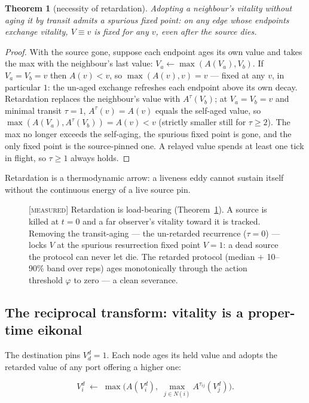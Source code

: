 \documentclass[11pt]{article}
\theoremstyle{plain}
\newtheorem{theorem}{Theorem}[section]
\numberwithin{equation}{section}
\begin{document}
\begin{theorem}[necessity of retardation]\label{thm:retardation}
Adopting a neighbour's vitality without aging it by transit admits a spurious fixed point: on any edge whose endpoints exchange vitality, $V\equiv v$ is fixed for any $v$, even after the source dies.
\end{theorem}
\begin{proof}
With the source gone, suppose each endpoint ages its own value and takes the max with the neighbour's last value: $V_a\leftarrow\max(A(V_a),V_b)$. If $V_a=V_b=v$ then $A(v)<v$, so $\max(A(v),v)=v$ — fixed at any $v$, in particular $1$: the un-aged exchange refreshes each endpoint above its own decay. Retardation replaces the neighbour's value with $A^{\tau}(V_b)$; at $V_a=V_b=v$ and minimal transit $\tau=1$, $A^{\tau}(v)=A(v)$ equals the self-aged value, so $\max(A(V_a),A^{\tau}(V_b))=A(v)<v$ (strictly smaller still for $\tau\ge 2$). The max no longer exceeds the self-aging, the spurious fixed point is gone, and the only fixed point is the source-pinned one. A relayed value spends at least one tick in flight, so $\tau\ge 1$ always holds.
\end{proof}

Retardation is a thermodynamic arrow: a liveness eddy cannot sustain itself without the continuous energy of a live source pin.

\begin{figure}[tbp]
\centering

\caption{\textsc{[measured]} Retardation is load-bearing (Theorem~\ref{thm:retardation}). A source is killed at $t=0$ and a far observer's vitality toward it is tracked. Removing the transit-aging — the un-retarded recurrence ($\tau=0$) — locks $V$ at the spurious resurrection fixed point $V=1$: a dead source the protocol can never let die. The retarded protocol (median $+$ 10--90\% band over reps) ages monotonically through the action threshold $\varphi$ to zero — a clean severance.}
\label{fig:retardation}
\end{figure}

\subsection{The reciprocal transform: vitality is a proper-time eikonal}\label{sec:reciprocal}

The destination pins $V^d_d=1$. Each node ages its held value and adopts the retarded value of any port offering a higher one:

\begin{equation}\label{eq:vitality-update}
V^d_i\;\longleftarrow\;\max\!\Big(A(V^d_i),\;\max_{j\in N(i)}A^{\tau_{ij}}(V^d_j)\Big).
\end{equation}
\end{document}
